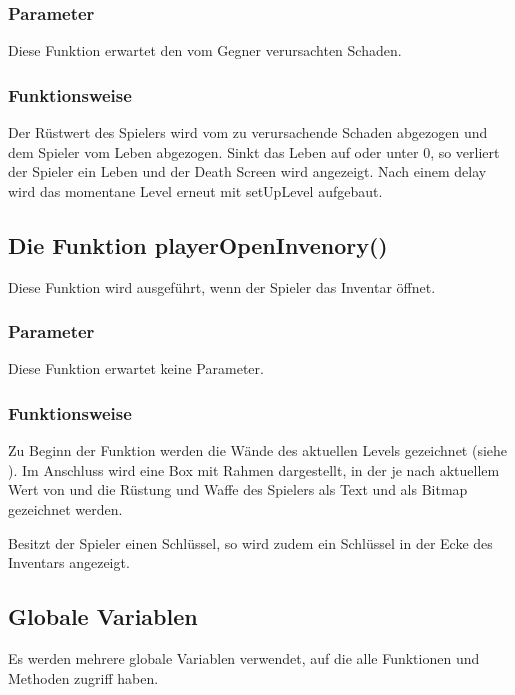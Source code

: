 \documentclass[letterpaper,10pt,ngerman]{sphinxmanual}
\begin{document}
\subsubsection{Parameter}
\label{\detokenize{programming:id23}}
Diese Funktion erwartet den vom Gegner verursachten Schaden.


\subsubsection{Funktionsweise}
\label{\detokenize{programming:id24}}
Der Rüstwert des Spielers wird vom zu verursachende Schaden abgezogen und dem
Spieler vom Leben abgezogen. Sinkt das Leben auf oder unter 0, so verliert der
Spieler ein Leben und der Death Screen wird angezeigt. Nach einem delay wird
das momentane Level erneut mit setUpLevel aufgebaut.


\subsection{Die Funktion playerOpenInvenory()}
\label{\detokenize{programming:die-funktion-playeropeninvenory}}
Diese Funktion wird ausgeführt, wenn der Spieler das Inventar öffnet.


\subsubsection{Parameter}
\label{\detokenize{programming:id25}}
Diese Funktion erwartet keine Parameter.


\subsubsection{Funktionsweise}
\label{\detokenize{programming:id26}}
Zu Beginn der Funktion werden die Wände des aktuellen Levels gezeichnet
(siehe ). Im Anschluss wird eine Box mit Rahmen dargestellt, in der
je nach aktuellem Wert von  und  die Rüstung
und Waffe des Spielers als Text und als Bitmap gezeichnet werden.

Besitzt der Spieler einen Schlüssel, so wird zudem ein Schlüssel in der Ecke
des Inventars angezeigt.


\subsection{Globale Variablen}
\label{\detokenize{programming:globale-variablen}}
Es werden mehrere globale Variablen verwendet, auf die alle Funktionen und
Methoden zugriff haben.
\end{document}
